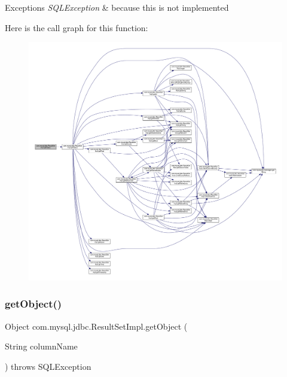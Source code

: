 \begin{DoxyExceptions}{Exceptions}
{\em S\+Q\+L\+Exception} & because this is not implemented \\
\hline
\end{DoxyExceptions}
Here is the call graph for this function\+:
\nopagebreak
\begin{figure}[H]
\begin{center}
\leavevmode
\includegraphics[width=350pt]{classcom_1_1mysql_1_1jdbc_1_1_result_set_impl_aa6397841fe3f64b790d65903480a8e46_cgraph}
\end{center}
\end{figure}
\mbox{\label{classcom_1_1mysql_1_1jdbc_1_1_result_set_impl_a1880c60be672be45187ea22e8b63768b}} 
\subsubsection{\texorpdfstring{get\+Object()}{getObject()}\hspace{0.1cm}{\footnotesize\ttfamily [3/4]}}
{\footnotesize\ttfamily Object com.\+mysql.\+jdbc.\+Result\+Set\+Impl.\+get\+Object (\begin{DoxyParamCaption}\item[{String}]{column\+Name }\end{DoxyParamCaption}) throws S\+Q\+L\+Exception}

